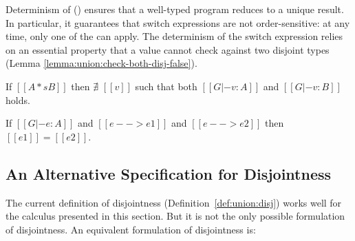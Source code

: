 Determinism of \name () ensures
that a well-typed program reduces to a unique result.
In particular,
it guarantees that
switch expressions are not order-sensitive: at any time, only one of the
 can apply.
The determinism of the switch expression
relies on an essential property
that a value cannot check against two disjoint types (Lemma \ref{lemma:union:check-both-disj-false}).

\begin{lemma}
  \label{lemma:union:check-both-disj-false}
  If $[[A *s B]]$ then $\nexists$ $[[v]]$ such that both
  $[[G |- v : A]]$ and $[[G |- v : B]]$ holds.
\end{lemma}


\begin{theorem}[Determinism]
\label{lemma:union:determinism}
  If $[[G |- e : A]]$ and $[[e --> e1]]$ and $[[e --> e2]]$ then $[[e1]]=[[e2]]$.
\end{theorem}




\subsection{An Alternative Specification for Disjointness}\label{sec:union:discussion}

The current definition of disjointness (Definition~\ref{def:union:disj})
works well for the calculus presented in this section. But it is not the only
possible formulation of disjointness.
An equivalent formulation of disjointness is:

